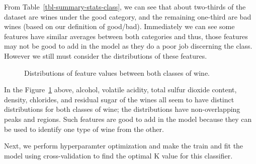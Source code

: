 \documentclass[
  letterpaper,
  DIV=11,
  numbers=noendperiod]{scrartcl}
\begin{document}
From Table~\ref{tbl-summary-stats-class}, we can see that about
two-thirds of the dataset are wines under the good category, and the
remaining one-third are bad wines (based on our definition of good/bad).
Immediately we can see some features have similar averages between both
categories and thus, those features may not be good to add in the model
as they do a poor job discerning the class. However we still must
consider the distributions of these features.

\begin{figure}


\caption{\label{fig-feat-dist}Distributions of feature values between
both classes of wine.}

\end{figure}%

In the Figure~\ref{fig-feat-dist} above, alcohol, volatile acidity,
total sulfur dioxide content, density, chlorides, and residual sugar of
the wines all seem to have distinct distributions for both classes of
wine; the distributions have non-overlapping peaks and regions. Such
features are good to add in the model because they can be used to
identify one type of wine from the other.

Next, we perform hyperparamter optimization and make the train and fit
the model using cross-validation to find the optimal K value for this
classifier.
\end{document}
